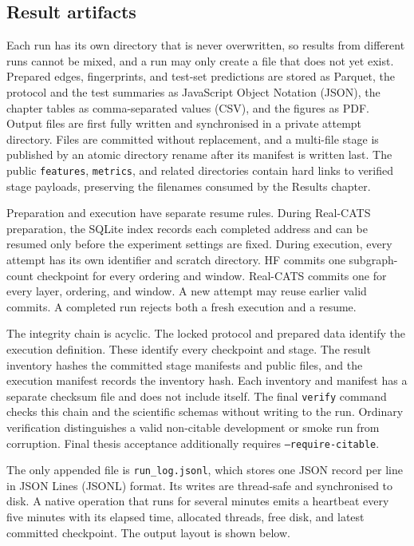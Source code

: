 \subsection{Result artifacts}

Each run has its own directory that is never overwritten, so results from
different runs cannot be mixed, and a run may only create a file that does not yet
exist. Prepared edges, fingerprints, and test-set predictions are stored as
Parquet, the protocol and the test summaries as JavaScript Object Notation
(JSON), the chapter tables as comma-separated values (CSV),
and the figures as PDF. Output files are first fully written and synchronised in
a private attempt directory. Files are committed without replacement, and a
multi-file stage is published by an atomic directory rename after its manifest is
written last. The public \texttt{features}, \texttt{metrics}, and related
directories contain hard links to verified stage payloads, preserving the
filenames consumed by the Results chapter.

Preparation and execution have separate resume rules. During Real-CATS
preparation, the SQLite index records each completed address and can be resumed
only before the experiment settings are fixed. During execution, every attempt
has its own identifier and scratch directory. HF commits one subgraph-count
checkpoint for every ordering and window. Real-CATS commits one for every layer, ordering, and
window. A new attempt may reuse earlier valid commits. A completed run rejects
both a fresh execution and a resume.

The integrity chain is acyclic. The locked protocol and prepared data identify
the execution definition. These identify every checkpoint and stage. The
result inventory hashes the committed stage manifests and public files, and the
execution manifest records the inventory hash. Each inventory and manifest has
a separate checksum file and does not include itself. The final
\texttt{verify} command checks this chain and the scientific schemas without
writing to the run. Ordinary verification distinguishes a valid non-citable
development or smoke run from corruption. Final thesis acceptance additionally
requires \texttt{--require-citable}.

The only appended file is \texttt{run\_log.jsonl}, which stores one JSON record
per line in JSON Lines (JSONL) format. Its writes are thread-safe
and synchronised to disk. A native operation that runs for several minutes
emits a heartbeat every five minutes with its elapsed time, allocated threads,
free disk, and latest committed checkpoint. The output layout is shown below.

